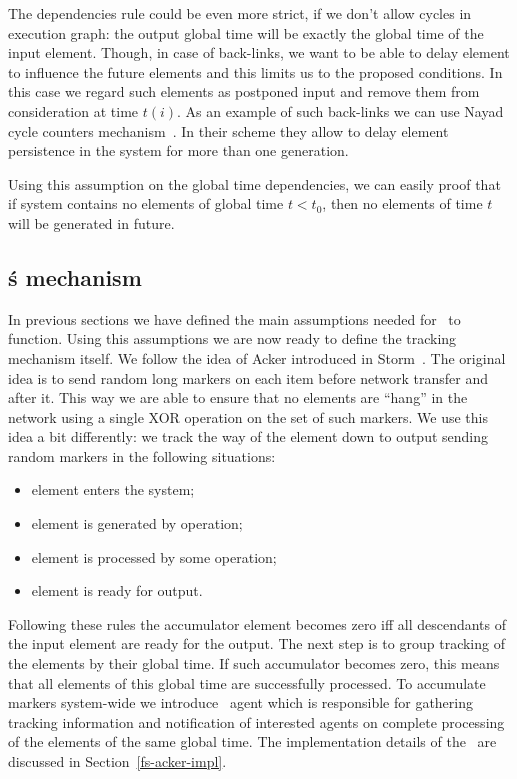The dependencies rule could be even more strict, if we don't allow cycles in execution graph: the output global time will be exactly the global time of the input element. Though, in case of back-links, we want to be able to delay element to influence the future elements and this limits us to the proposed conditions. In this case we regard such elements as postponed input and remove them from consideration at time $t(i)$. As an example of such back-links we can use Nayad cycle counters mechanism~\cite{Murray:2013:NTD:2517349.2522738}. In their scheme they allow to delay element persistence in the system for more than one generation.

Using this assumption on the global time dependencies, we can easily proof that if system contains no elements of global time $t < t_0$, then no elements of time $t$ will be generated in future.

\subsection{\tracker\'s mechanism} \label{tracker_mechanism}
In previous sections we have defined the main assumptions needed for \tracker\ to function. Using this assumptions we are now ready to define the tracking mechanism itself. We follow the idea of Acker introduced in Storm~\cite{Toshniwal:2014:STO:2588555.2595641}. The original idea is to send random long markers on each item before network transfer and after it. This way we are able to ensure that no elements are ``hang'' in the network using a single XOR operation on the set of such markers. We use this idea a bit differently: we track the way of the element down to output sending random markers in the following situations:
\begin{itemize}
    \item element enters the system;
    \item element is generated by operation;
    \item element is processed by some operation;
    \item element is ready for output.
\end{itemize}
Following these rules the accumulator element becomes zero iff all descendants of the input element are ready for the output. The next step is to group tracking of the elements by their global time. If such accumulator becomes zero, this means that all elements of this global time are successfully processed. To accumulate markers system-wide we introduce \tracker\ agent which is responsible for gathering tracking information and notification of interested agents on complete processing of the elements of the same global time. The implementation details of the \tracker\ are discussed in Section~\ref{fs-acker-impl}.

